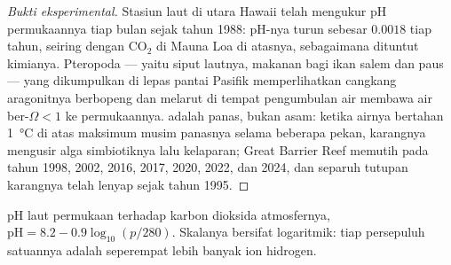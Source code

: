 \begin{proof}[Bukti eksperimental]
Stasiun laut di utara Hawaii telah mengukur pH permukaannya tiap bulan
sejak tahun 1988: pH-nya turun sebesar $0.0018$ tiap tahun, seiring
dengan \ensuremath{\mathrm{CO_2}} di Mauna Loa di atasnya, sebagaimana dituntut
kimianya. Pteropoda --- yaitu siput lautnya, makanan bagi ikan salem
dan paus --- yang dikumpulkan di lepas pantai Pasifik memperlihatkan
cangkang aragonitnya berbopeng dan melarut di tempat pengumbulan air
membawa air ber-$\Omega <
1$ ke permukaannya.  adalah
panas, bukan asam: ketika airnya bertahan \qty{1}{\celsius} di atas
maksimum musim panasnya selama beberapa pekan, karangnya mengusir alga
simbiotiknya lalu kelaparan; Great Barrier Reef memutih pada tahun
1998, 2002, 2016, 2017, 2020, 2022, dan 2024, dan separuh tutupan
karangnya telah lenyap sejak tahun 1995.
\end{proof}

\begin{omfigure}

{\small pH laut permukaan terhadap karbon dioksida atmosfernya,
$\mathrm{pH} = 8.2 - 0.9\log_{10}(p/280)$. Skalanya bersifat
logaritmik: tiap persepuluh satuannya adalah seperempat lebih banyak
ion hidrogen.}
\end{omfigure}

